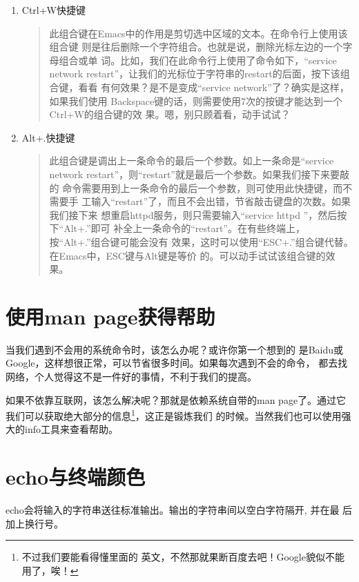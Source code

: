 \begin{enumerate}[itemsep=0pt,parsep=0pt]
\item Ctrl+W快捷键
  \begin{quote}
    此组合键在Emacs中的作用是剪切选中区域的文本。在命令行上使用该组合键
    则是往后删除一个字符组合。也就是说，删除光标左边的一个字母组合或单
    词。比如，我们在此命令行上使用了命令如下，“service network
    restart”，让我们的光标位于字符串的restart的后面，按下该组合键，看看
    有何效果？是不是变成“service network”了？确实是这样，如果我们使用
    Backspace键的话，则需要使用7次的按键才能达到一个Ctrl+W的组合键的效
    果。嗯，别只顾着看，动手试试？
  \end{quote}

\item Alt+.快捷键
  \begin{quote}
    此组合键是调出上一条命令的最后一个参数。如上一条命是“service
    network restart”，则“restart”就是最后一个参数。如果我们接下来要敲的
    命令需要用到上一条命令的最后一个参数，则可使用此快捷键，而不需要手
    工输入“restart”了，而且不会出错，节省敲击键盘的次数。如果我们接下来
    想重启httpd服务，则只需要输入“service httpd ”，然后按下“Alt+.”即可
    补全上一条命令的“restart”。在有些终端上，按“Alt+.”组合键可能会没有
    效果，这时可以使用“ESC+.”组合键代替。在Emacs中，ESC键与Alt键是等价
    的。可以动手试试该组合键的效果。
  \end{quote}

\end{enumerate}

\section{使用man page获得帮助}
\label{sec:getHelp}

当我们遇到不会用的系统命令时，该怎么办呢？或许你第一个想到的
是Baidu或Google，这样想很正常，可以节省很多时间。如果每次遇到不会的命令，
都去找网络，个人觉得这不是一件好的事情，不利于我们的提高。

如果不依靠互联网，该怎么解决呢？那就是依赖系统自带的man page了。通过它
我们可以获取绝大部分的信息\footnote{不过我们要能看得懂里面的
  英文，不然那就果断百度去吧！Google貌似不能用了，唉！}，这正是锻炼我们
的时候。当然我们也可以使用强大的info工具来查看帮助。

\section{echo与终端颜色}
\label{sec:echoCmd}

echo会将输入的字符串送往标准输出。输出的字符串间以空白字符隔开, 并在最
后加上换行号。

